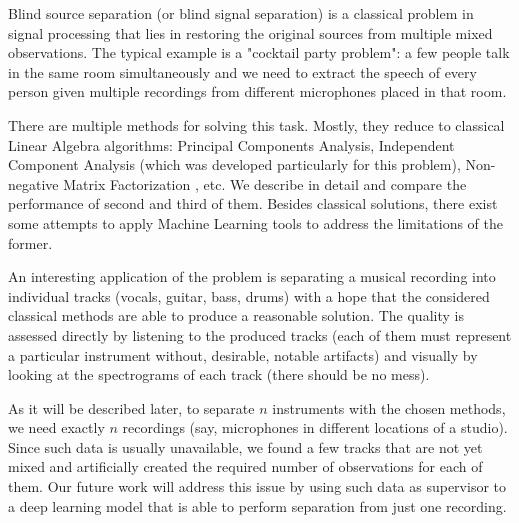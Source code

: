 \documentclass[../main.tex]{subfiles} %
\begin{document}

Blind source separation \cite{bss} (or blind signal separation) is a classical problem in signal processing that lies in restoring the original sources from multiple mixed observations. The typical example is a "cocktail party problem": a few people talk in the same room simultaneously and we need to extract the speech of every person given multiple recordings from different microphones placed in that room.

There are multiple methods for solving this task. Mostly, they reduce to classical Linear Algebra algorithms: Principal Components Analysis, Independent Component Analysis \cite{ica} (which was developed particularly for this problem), Non-negative Matrix Factorization \cite{nmf}, etc. We describe in detail and compare the performance of second and third of them. Besides classical solutions, there exist some attempts to apply Machine Learning tools \cite{mlbss} to address the limitations of the former.


An interesting application of the problem is separating a musical recording into individual tracks (vocals, guitar, bass, drums) with a hope that the considered classical methods are able to produce a reasonable solution. 
The quality is assessed directly by listening to the produced tracks (each of them must represent a particular instrument without, desirable, notable artifacts) and visually by looking at the spectrograms of each track (there should be no mess).


As it will be described later, to separate $n$ instruments with the chosen methods, we need exactly $n$ recordings (say, microphones in different locations of a studio). Since such data is usually unavailable, we found a few tracks that are not yet mixed and artificially created the required number of observations for each of them. Our future work will address this issue by using such data as supervisor to a deep learning model that is able to perform separation from just one recording.
 
\end{document}
